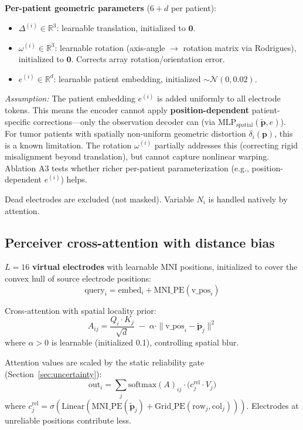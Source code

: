 \documentclass[11pt,letterpaper]{article}
\newcommand{\assumption}[1]{\par\smallskip\noindent\textcolor{BrickRed}{\textit{Assumption:} #1}\smallskip}
\newcommand{\bfp}{\mathbf{p}}
\newcommand{\R}{\mathbb{R}}
\begin{document}
\textbf{Per-patient geometric parameters} ($6 + d$ per patient):
\begin{itemize}[leftmargin=2em]
\item $\Delta^{(i)} \in \R^3$: learnable translation, initialized to $\mathbf{0}$.
\item $\omega^{(i)} \in \R^3$: learnable rotation (axis-angle $\to$ rotation matrix via Rodrigues), initialized to $\mathbf{0}$. Corrects array rotation/orientation error.
\item $e^{(i)} \in \R^d$: learnable patient embedding, initialized $\sim \mathcal{N}(0, 0.02)$.
\end{itemize}

\assumption{The patient embedding $e^{(i)}$ is added uniformly to all electrode tokens. This means the encoder cannot apply \textbf{position-dependent} patient-specific corrections---only the observation decoder can (via $\text{MLP}_{\text{spatial}}(\tilde{\bfp}, e)$). For tumor patients with spatially non-uniform geometric distortion $\delta_i(\bfp)$, this is a known limitation. The rotation $\omega^{(i)}$ partially addresses this (correcting rigid misalignment beyond translation), but cannot capture nonlinear warping. Ablation A3 tests whether richer per-patient parameterization (e.g., position-dependent $e^{(i)}$) helps.}

Dead electrodes are excluded (not masked). Variable $N_i$ is handled natively by attention.

\subsection{Perceiver cross-attention with distance bias}

$L = 16$ \textbf{virtual electrodes} with learnable MNI positions, initialized to cover the convex hull of source electrode positions:
\begin{equation}
\text{query}_i = \text{embed}_i + \text{MNI\_PE}(\text{v\_pos}_i)
\end{equation}

Cross-attention with spatial locality prior:
\begin{equation}
\boxed{A_{ij} = \frac{Q_i \cdot K_j}{\sqrt{d}} \;-\; \alpha \cdot \|\text{v\_pos}_i - \tilde{\bfp}_j\|^2}
\end{equation}
where $\alpha > 0$ is learnable (initialized 0.1), controlling spatial blur.

Attention values are scaled by the static reliability gate (Section~\ref{sec:uncertainty}):
\begin{equation}
\text{out}_i = \sum_j \text{softmax}(A)_{ij} \cdot \bigl(c_j^{\text{rel}} \cdot V_j\bigr)
\end{equation}
where $c_j^{\text{rel}} = \sigma(\text{Linear}(\text{MNI\_PE}(\tilde{\bfp}_j) + \text{Grid\_PE}(\text{row}_j, \text{col}_j)))$. Electrodes at unreliable positions contribute less.
\end{document}
